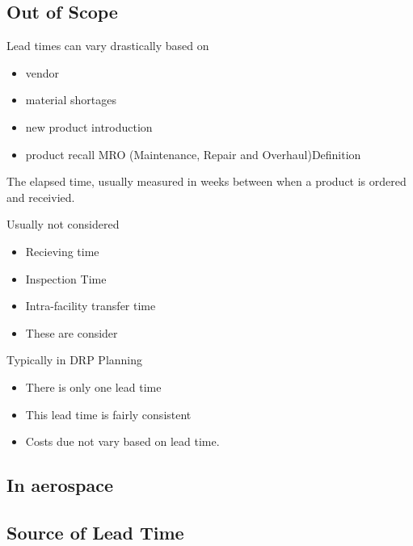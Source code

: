 \documentclass[letterpaper,10pt,english]{sphinxmanual}
\begin{document}
\subsection{Out of Scope}
\label{\detokenize{750-Requisitions:out-of-scope}}
Lead times can vary drastically based on
\begin{itemize}
\item {} 
vendor

\item {} 
material shortages

\item {} 
new product introduction

\item {} 
product recall MRO (Maintenance, Repair and Overhaul)Definition

\end{itemize}

The elapsed time, usually measured in weeks between when a product
is ordered and receivied.

Usually not considered
\begin{itemize}
\item {} 
Recieving time

\item {} 
Inspection Time

\item {} 
Intra-facility transfer time

\item {} 
These are consider 

\end{itemize}

Typically in DRP Planning
\begin{itemize}
\item {} 
There is only one lead time

\item {} 
This lead time is fairly consistent

\item {} 
Costs due not vary based on lead time.

\end{itemize}


\subsection{In aerospace}
\label{\detokenize{750-Requisitions:in-aerospace}}

\subsection{Source of Lead Time}
\label{\detokenize{750-Requisitions:source-of-lead-time}}
\end{document}
